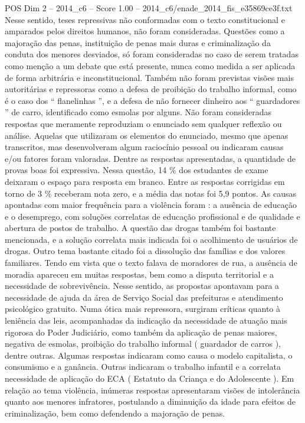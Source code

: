 \begin{textsample}{POS Dim 2 – 2014\_c6 – Score 1.00 – 2014\_c6/enade\_2014\_fis\_e35869ce3f.txt}
Nesse sentido, teses repressivas não conformadas com o texto constitucional e amparados pelos direitos humanos, não foram consideradas.
Questões como a majoração das penas, instituição de penas mais duras e criminalização da conduta dos menores desviados, só foram consideradas no caso de serem tratadas como menção a um debate que está presente, nunca como medida a ser aplicada de forma arbitrária e inconstitucional.
Também não foram previstas visões mais autoritárias e repressoras como a defesa de proibição do trabalho informal, como é o caso dos “ flanelinhas ”, e a defesa de não fornecer dinheiro aos “ guardadores ” de carro, identificado como esmolas por alguns.
Não foram consideradas respostas que meramente reproduziam o enunciado sem qualquer reflexão ou análise.
Aquelas que utilizaram os elementos do enunciado, mesmo que apenas transcritos, mas desenvolveram algum raciocínio pessoal ou indicaram causas e/ou fatores foram valoradas.
Dentre as respostas apresentadas, a quantidade de provas boas foi expressiva.
Nessa questão, 14 \% dos estudantes de exame deixaram o espaço para resposta em branco.
Entre as respostas corrigidas em torno de 3 \% receberam nota zero, e a média das notas foi 5,9 pontos.
As causas apontadas com maior frequência para a violência foram : a ausência de educação e o desemprego, com soluções correlatas de educação profissional e de qualidade e abertura de postos de trabalho.
A questão das drogas também foi bastante mencionada, e a solução correlata mais indicada foi o acolhimento de usuários de drogas.
Outro tema bastante citado foi a dissolução das famílias e dos valores familiares.
Tendo em vista que o texto falava de moradores de rua, a ausência de moradia apareceu em muitas respostas, bem como a disputa territorial e a necessidade de sobrevivência.
Nesse sentido, as propostas apontavam para a necessidade de ajuda da área de Serviço Social das prefeituras e atendimento psicológico gratuito.
Numa ótica mais repressora, surgiram críticas quanto à leniência das leis, acompanhadas da indicação da necessidade de atuação mais rigorosa do Poder Judiciário, como também da aplicação de penas maiores, negativa de esmolas, proibição do trabalho informal ( guardador de carros ), dentre outras.
Algumas respostas indicaram como causa o modelo capitalista, o consumismo e a ganância.
Outras indicaram o trabalho infantil e a correlata necessidade de aplicação do ECA ( Estatuto da Criança e do Adolescente ).
Em relação ao tema violência, inúmeras respostas apresentaram visões de intolerância quanto aos menores infratores, postulando a diminuição da idade para efeitos de criminalização, bem como defendendo a majoração de penas.

\end{textsample}
